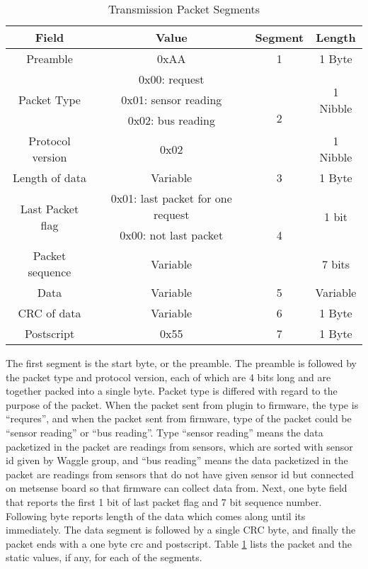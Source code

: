 \begin{table}[H]
    \centering
    {
    \begin{tabular}{|c|c|c|c|}
        \hline
        \rowcolor{black!8}
        \textbf{Field} & \textbf{Value} & \textbf{Segment} & \textbf{Length}\\
        \hline
        Preamble & 0xAA & 1 & 1 Byte\\ \hline
        \multirow{3}{*}{Packet Type} & 0x00: request & \multirow{4}{*}{2} & \multirow{3}{*}{1 Nibble} \\
         & 0x01: sensor reading & & \\ 
         & 0x02: bus reading & & \\ \cline{1-2} \cline{4-4}
        Protocol version & 0x02 &  & 1 Nibble\\ \hline
        Length of data & Variable & 3 & 1 Byte\\ \hline
        \multirow{2}{*}{Last Packet flag} & 0x01: last packet for one request & \multirow{3}{*}{4} & \multirow{2}{*}{1 bit} \\
         & 0x00: not last packet & & \\ \cline{1-2} \cline{4-4}
        Packet sequence & Variable &  & 7 bits \\ \hline
        Data & Variable & 5 & Variable \\ \hline
        CRC of data & Variable & 6 & 1 Byte\\ \hline
        Postscript & 0x55 & 7 & 1 Byte\\ \hline
    \end{tabular}
    }
    \caption{Transmission Packet Segments}
    \label{table:seg}
\end{table}


The first segment is the start byte, or the preamble. The preamble is followed by the packet type and protocol version, each of which are 4 bits long and are together packed into a single byte. Packet type is differed with regard to the purpose of the packet. When the packet sent from plugin to firmware, the type is ``requres'', and when the packet sent from firmware, type of the packet could be ``sensor reading'' or ``bus reading''. Type ``sensor reading'' means the data packetized in the packet are readings from sensors, which are sorted with sensor id given by Waggle group, and ``bus reading'' means the data packetized in the packet are readings from sensors that do not have given sensor id but connected on metsense board so that firmware can collect data from.
Next, one byte field that reports the first 1 bit of last packet flag and 7 bit sequence number. Following byte reports length of the data which comes along until its
immediately. The data segment is followed by a single CRC byte, and finally the packet ends with a one byte
crc and postscript. Table \ref{table:seg} lists the packet and the static values, if any, for each of the segments.
\\


